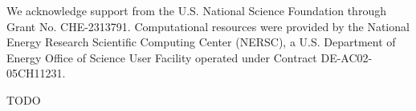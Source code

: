 \documentclass[journal=jctcce,manuscript=article]{achemso}
\begin{document}
\begin{acknowledgement}
We acknowledge support from the U.S. National Science Foundation through Grant No. CHE-2313791. Computational resources were provided by the National Energy Research Scientific Computing Center (NERSC), a U.S. Department of Energy Office of Science User Facility operated under Contract DE-AC02-05CH11231.
\end{acknowledgement}

\begin{suppinfo}

TODO

\end{suppinfo}


\end{document}
